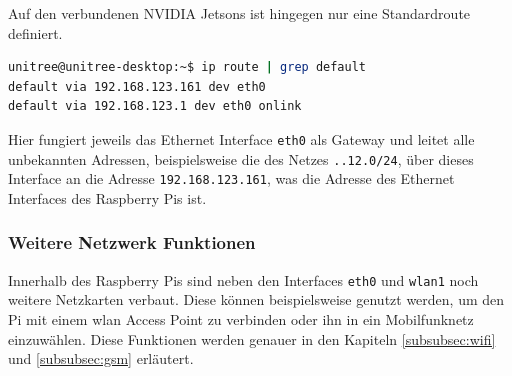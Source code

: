 Auf den verbundenen NVIDIA Jetsons ist hingegen nur eine Standardroute definiert.

\begin{lstlisting}[language=Bash]
unitree@unitree-desktop:~$ ip route | grep default
default via 192.168.123.161 dev eth0
default via 192.168.123.1 dev eth0 onlink
\end{lstlisting}

\noindent Hier fungiert jeweils das Ethernet Interface \texttt{eth0} als Gateway und leitet alle unbekannten Adressen,
beispielsweise die des Netzes \texttt{..12.0/24}, über dieses Interface an die Adresse \texttt{192.168.123.161}, was
die Adresse des Ethernet Interfaces des Raspberry Pis ist.

\subsubsection{Weitere Netzwerk Funktionen}

Innerhalb des Raspberry Pis sind neben den Interfaces \texttt{eth0} und \texttt{wlan1} noch weitere Netzkarten verbaut.
Diese können beispielsweise genutzt werden, um den Pi mit einem \gls{wlan} Access Point zu verbinden oder ihn in ein
Mobilfunknetz einzuwählen.
Diese Funktionen werden genauer in den Kapiteln \ref{subsubsec:wifi} und \ref{subsubsec:gsm} erläutert.



